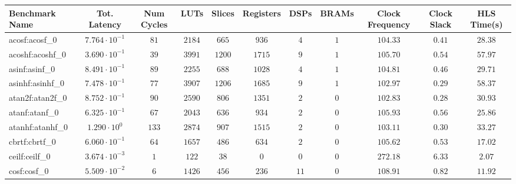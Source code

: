 \begin{tabular}{|l|c|c|c|c|c|c|c|c|c|c|}
\hline
Benchmark Name               & Tot. Latency            & Num Cycles & LUTs      & Slices    & Registers & DSPs    & BRAMs & Clock Frequency & Clock Slack & HLS Time(s) \\
\hline
acosf:acosf\_0               & $ 7.764 \cdot 10^{-1} $ & $ 81     $ & $ 2184  $ & $ 665   $ & $ 936   $ & $ 4   $ & $ 1 $ & $ 104.33      $ & $ 0.41    $ & $ 28.38   $ \\
acoshf:acoshf\_0             & $ 3.690 \cdot 10^{-1} $ & $ 39     $ & $ 3991  $ & $ 1200  $ & $ 1715  $ & $ 9   $ & $ 1 $ & $ 105.70      $ & $ 0.54    $ & $ 57.97   $ \\
asinf:asinf\_0               & $ 8.491 \cdot 10^{-1} $ & $ 89     $ & $ 2255  $ & $ 688   $ & $ 1028  $ & $ 4   $ & $ 1 $ & $ 104.81      $ & $ 0.46    $ & $ 29.71   $ \\
asinhf:asinhf\_0             & $ 7.478 \cdot 10^{-1} $ & $ 77     $ & $ 3907  $ & $ 1206  $ & $ 1685  $ & $ 9   $ & $ 1 $ & $ 102.97      $ & $ 0.29    $ & $ 58.37   $ \\
atan2f:atan2f\_0             & $ 8.752 \cdot 10^{-1} $ & $ 90     $ & $ 2590  $ & $ 806   $ & $ 1351  $ & $ 2   $ & $ 0 $ & $ 102.83      $ & $ 0.28    $ & $ 30.93   $ \\
atanf:atanf\_0               & $ 6.325 \cdot 10^{-1} $ & $ 67     $ & $ 2043  $ & $ 636   $ & $ 934   $ & $ 2   $ & $ 0 $ & $ 105.93      $ & $ 0.56    $ & $ 25.86   $ \\
atanhf:atanhf\_0             & $ 1.290 \cdot 10^{0}  $ & $ 133    $ & $ 2874  $ & $ 907   $ & $ 1515  $ & $ 2   $ & $ 0 $ & $ 103.11      $ & $ 0.30    $ & $ 33.27   $ \\
cbrtf:cbrtf\_0               & $ 6.060 \cdot 10^{-1} $ & $ 64     $ & $ 1657  $ & $ 486   $ & $ 634   $ & $ 2   $ & $ 0 $ & $ 105.62      $ & $ 0.53    $ & $ 17.02   $ \\
ceilf:ceilf\_0               & $ 3.674 \cdot 10^{-3} $ & $ 1      $ & $ 122   $ & $ 38    $ & $ 0     $ & $ 0   $ & $ 0 $ & $ 272.18      $ & $ 6.33    $ & $ 2.07    $ \\
cosf:cosf\_0                 & $ 5.509 \cdot 10^{-2} $ & $ 6      $ & $ 1426  $ & $ 456   $ & $ 236   $ & $ 11  $ & $ 0 $ & $ 108.91      $ & $ 0.82    $ & $ 11.92   $ \\

\end{tabular}
